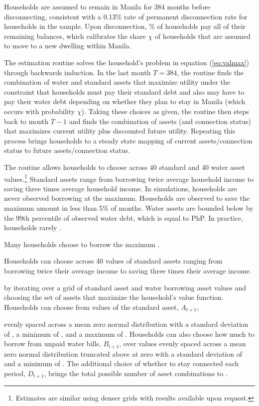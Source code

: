 \documentclass[12pt]{article}
\begin{document}
Households are assumed to remain in Manila for 384 months before disconnecting, consistent with a 0.13\% rate of permanent disconnection rate for households in the sample.  Upon disconnection, \unskip\% of households pay all of their remaining balances, which calibrates the share $\chi$ of households that are assumed to move to a new dwelling within Manila.

The estimation routine solves the household's problem in equation (\ref{eq:valmax}) through backwards induction.  In the last month $T=384$, the routine finds the combination of water and standard assets that maximize utility under the constraint that households must pay their standard debt and also may have to pay their water debt depending on whether they plan to stay in Manila (which occurs with probability $\chi$).  Taking these choices as given, the routine then steps back to month $T-1$ and finds the combination of assets (and connection status) that maximizes current utility plus discounted future utility.  Repeating this process brings households to a steady state mapping of current assets/connection status to future assets/connection status.  

The routine allows households to choose across 40 standard and 40 water asset values.\footnote{Estimates are similar using denser grids with results available upon request.}  Standard assets range from borrowing twice average household income to saving three times average household income.  In simulations, households are never observed borrowing at the maximum.  Households are observed to save the maximum amount in less than 5\% of months.  Water assets are bounded below by the 99th percentile of observed water debt, which is equal to PhP.  In practice, households rarely  .  

Many households choose to borrow the maximum .

Households can choose across 40 values of standard assets ranging from borrowing twice their average income to saving three times their average income.


 by iterating over a grid of standard asset and water borrowing asset values and choosing the set of assets that maximize the household's value function.  Households can choose from values of the standard asset, $A_{t+1}$, 

evenly spaced across a mean zero normal distribution with a standard deviation of \unskip, a minimum of \unskip, and a maximum of \unskip.  Households can also choose how much to borrow from unpaid water bills, $B_{t+1}$, over values evenly spaced across a mean zero normal distribution truncated above at zero with a standard deviation of and a minimum of \unskip.  The additional choice of whether to stay connected each period, $D_{t+1}$, brings the total possible number of asset combinations to \unskip.
\end{document}
